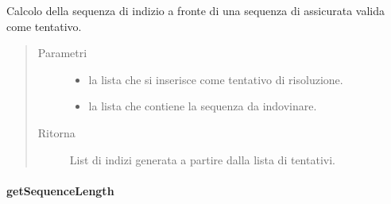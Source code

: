 \documentclass[letterpaper,10pt,italian]{sphinxmanual}
\begin{document}
\begin{fulllineitems}
\label{\detokenize{source/it/unicam/cs/pa/mastermind/gamecore/BoardModel:it.unicam.cs.pa.mastermind.gamecore.BoardModel.getClueFromAttempt(List)}}
Calcolo della sequenza di  indizio a fronte di una sequenza di  assicurata valida come tentativo.
\begin{quote}\begin{description}
\item[{Parametri}] \leavevmode\begin{itemize}
\item {} 
 \textendash{} la lista che si inserisce come tentativo di risoluzione.

\item {} 
 \textendash{} la lista che contiene la sequenza da indovinare.

\end{itemize}

\item[{Ritorna}] \leavevmode
List di indizi generata a partire dalla lista di tentativi.

\end{description}\end{quote}

\end{fulllineitems}



\paragraph{getSequenceLength}
\label{\detokenize{source/it/unicam/cs/pa/mastermind/gamecore/BoardModel:getsequencelength}}
\end{document}
